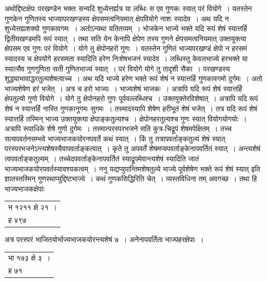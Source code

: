 \documentclass[11pt, openany]{book}
\begin{document}
{{अथोद्दिष्टक्षेपः परखण्डेन भक्तः सन्यदि शुध्येत्तर्ह्यत्र या लब्धिः स एव
गुणकः स्यात् परं वियोगे~। यतस्तेन गुणकेन गुणितस्य भाज्यापरखण्डस्य 
क्षेपसमत्वनियमात् क्षेपवियोगे
नाशः स्यादेव~। अथ यदि न शुध्येत्तह्यशक्यो गुणकावगमः~। अतोऽन्यथा
यतितव्यम्~। 
भोजकेन भाज्ये भक्ते यदि रूपं शेषं स्यात्तर्हि द्वितीयखण्डमपि रूपं स्यात्~। 
तथा सति येन केनापि क्षेपेण तस्य गुणने क्षेपसमत्वनियमात् उक्तयुक्त्या 
क्षेपसम एव गुणः परं वियोगे~। योगे तु क्षेपोनहरो गुणः~। यतस्तेन गुणितं भाज्यपरखण्डं क्षेपो न हरसमं स्यादस्य च क्षेपयोगे हरसमता स्यादिति हरेण
निःशेषभजनं स्यादेव~। लब्धिस्तु केवलभाज्ये हरभक्ते या स्यात्सैव गुणगुणिता सती
गुणितभाज्यं स्यात्~। 
परं वियोगे योगे तु तादृशी सैका~। परखण्डस्य
शुद्ध्याभावाद्धरतुल्यशेषत्वाच्च~। अथ यदि 
भाज्ये हरेण भक्ते रूपं शेषं न स्यात्तर्हि गुणकावगमो दुर्गमः~। अतो 
भाज्यशेषेण हरं भजेत्~। अत्र च हरो भाज्यः~। भाज्यशेषं भाजकः~। 
अत्रापि यदि रूपं शेषं स्यात्तर्हि क्षेपतुल्यो गुणो वियोगे~। योगे तु
क्षेपोनहरो गुणः
\newpage
पूर्ववल्लब्धिश्च~। उक्तयुक्तेरविशेषात्~। अत्रापि यदि रूपं शेषं न
स्यात्तर्हि नास्ति गुणकानुगमः सुगमः~। तस्मादस्यापि शेषेण हरीभूतं शेषं भजेत्~। तत्र
यदि रूपं शेषं स्यात्तर्हि तस्मिन् भाज्य उक्तयुक्त्या
क्षेपाङ्कतुल्यश्च~। क्षेपोनहरतुल्यश्च गुणः स्यात् वियोगयोगयोः~।
अत्रापि रूपाधिके शेषे गुणो दुर्गमः~। तस्मात्परस्परभजने सति 
कुत्र-चिद्रूपं शेषमपेक्षितम्~। तच्च सत्यपवर्तनसम्भवे भाज्यभाजकयोरनपवर्ते
कथं स्यात्~। किं तु तत्रापवर्ताङ्कतुल्यं शेषं
स्यात् परस्परभजनेऽन्त्यशेषस्यैवापवर्ताङ्कत्वात्~। 
कृते तु अपवर्ते शेषमप्यपवर्ताङ्केनापवर्तितं स्यात्~। अन्त्यशेषं
त्वपवर्ताङ्कतुल्यम्~। तच्चेदपवर्ताङ्केनापवर्तितं
स्याद्रूपमेवान्त्यशेषं स्यादिति जातं भाज्यभाजकयोरपवर्तस्यावश्यकत्वम्~। ननु यद्यप्युपान्तिमशेषतुल्ये भाज्ये पूर्वशेषेण भक्ते रूपं
शेषं स्यात् इति ज्ञातस्तस्मिन् गुणस्थाप्युद्दिष्टभाज्ये~। कथं गुणकसिद्धिरिति
चेत्~। व्यस्तविधिना तम् अवगच्छ~। तथा हि\textendash \,भाज्यभाजकक्षेपाः

\vspace{-2mm}
\begin{table}[h!]
    \centering\s
    \begin{tabular}{l}
        भ १२११ क्षे २१~।\\
         ह ४९७ 
    \end{tabular}
\end{table}
\vspace{-2mm}

\noindent अत्र परस्परं भाजितयोर्भाज्यभाजकयोरन्त्यशेषं ७~। अनेनापवर्तिता
भाज्यहरक्षेपाः~।

\vspace{-2mm}
\begin{table}[h!]
    \centering\s
    \begin{tabular}{l}
    भा १७३ क्षे ३~। \\
        ह ७१
    \end{tabular}
\end{table}
\vspace{-2mm}

}}
\end{document}
